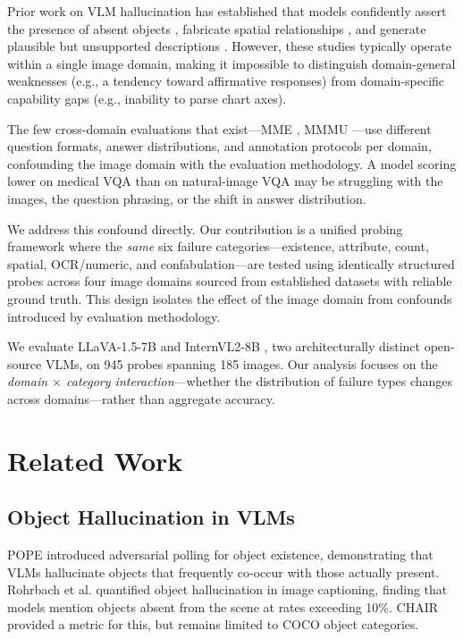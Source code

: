 \documentclass[conference]{IEEEtran}
\begin{document}
Prior work on VLM hallucination has established that models confidently assert the presence of absent objects \cite{li2023pope}, fabricate spatial relationships \cite{liu2023hallusionbench}, and generate plausible but unsupported descriptions \cite{rohrbach2018object}. However, these studies typically operate within a single image domain, making it impossible to distinguish domain-general weaknesses (e.g., a tendency toward affirmative responses) from domain-specific capability gaps (e.g., inability to parse chart axes).

The few cross-domain evaluations that exist---MME \cite{fu2023mme}, MMMU \cite{yue2023mmmu}---use different question formats, answer distributions, and annotation protocols per domain, confounding the image domain with the evaluation methodology. A model scoring lower on medical VQA than on natural-image VQA may be struggling with the images, the question phrasing, or the shift in answer distribution.

We address this confound directly. Our contribution is a unified probing framework where the \textit{same} six failure categories---existence, attribute, count, spatial, OCR/numeric, and confabulation---are tested using identically structured probes across four image domains sourced from established datasets with reliable ground truth. This design isolates the effect of the image domain from confounds introduced by evaluation methodology.

We evaluate LLaVA-1.5-7B \cite{liu2023llava15} and InternVL2-8B \cite{chen2024internvl}, two architecturally distinct open-source VLMs, on 945 probes spanning 185 images. Our analysis focuses on the \textit{domain $\times$ category interaction}---whether the distribution of failure types changes across domains---rather than aggregate accuracy.

\section{Related Work}

\subsection{Object Hallucination in VLMs}

POPE \cite{li2023pope} introduced adversarial polling for object existence, demonstrating that VLMs hallucinate objects that frequently co-occur with those actually present. Rohrbach et al. \cite{rohrbach2018object} quantified object hallucination in image captioning, finding that models mention objects absent from the scene at rates exceeding 10\%. CHAIR \cite{rohrbach2018object} provided a metric for this, but remains limited to COCO object categories.
\end{document}
